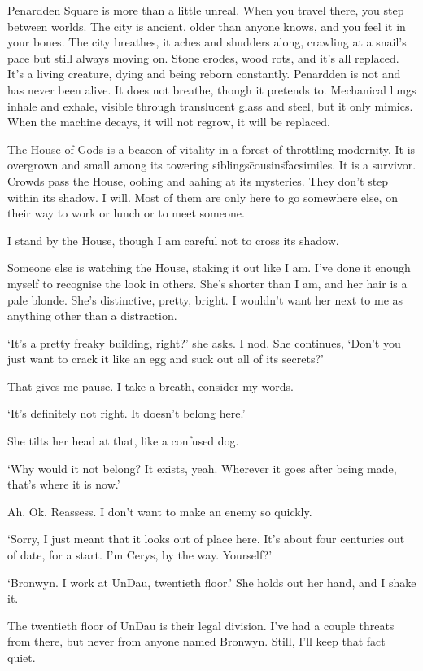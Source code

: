 Penardden Square is more than a little unreal. When you travel there,
you step between worlds. The city is ancient, older than anyone knows,
and you feel it in your bones. The city breathes, it aches and
shudders along, crawling at a snail’s pace but still always moving
on. Stone erodes, wood rots, and it’s all replaced. It’s a living
creature, dying and being reborn constantly. Penardden is not and has
never been alive. It does not breathe, though it pretends
to. Mechanical lungs inhale and exhale, visible through translucent
glass and steel, but it only mimics. When the machine decays, it will
not regrow, it will be replaced.

The House of Gods is a beacon of vitality in a forest of throttling
modernity. It is overgrown and small among its towering siblings\=%
cousins\=facsimiles. It is a survivor.  Crowds pass the House, oohing
and aahing at its mysteries. They don’t step within its shadow. I
will. Most of them are only here to go somewhere else, on their way to
work or lunch or to meet someone.

I stand by the House, though I am careful not to cross its shadow.

Someone else is watching the House, staking it out like I am. I’ve
done it enough myself to recognise the look in others. She’s shorter
than I am, and her hair is a pale blonde. She’s distinctive, pretty,
bright. I wouldn’t want her next to me as anything other than a
distraction.

`It’s a pretty freaky building, right?' she asks. I nod. She
continues, `Don’t you just want to crack it like an egg and suck out
all of its secrets?'

That gives me pause. I take a breath, consider my words.

`It’s definitely not right. It doesn’t belong here.'

She tilts her head at that, like a confused dog.

`Why would it not belong? It exists, yeah. Wherever it goes after
being made, that’s where it is now.'

Ah. Ok. Reassess. I don’t want to make an enemy so quickly.

`Sorry, I just meant that it looks out of place here. It’s about four
centuries out of date, for a start. I’m Cerys, by the way. Yourself?'

`Bronwyn. I work at UnDau, twentieth floor.' She holds out her hand,
and I shake it.

The twentieth floor of UnDau is their legal division. I’ve had a
couple threats from there, but never from anyone named Bronwyn. Still,
I’ll keep that fact quiet.

